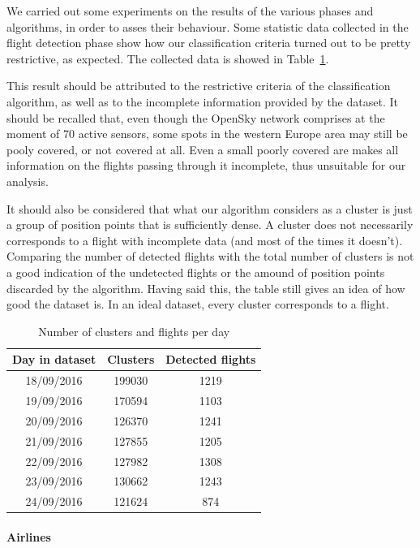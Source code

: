 \documentclass{vldb}
\begin{document}
We carried out some experiments on the results of the various phases and
algorithms, in order to asses their behaviour. Some statistic data collected in
the flight detection phase show how our classification criteria turned out to be
pretty restrictive, as expected. The collected data is showed in Table~\ref{table}.

This result should be attributed to the restrictive criteria of the
classification algorithm, as well as to the incomplete information provided by
the dataset. It should be recalled that, even though the OpenSky network
comprises at the moment of 70 active sensors, some spots in the western Europe
area may still be pooly covered, or not covered at all. Even a small poorly
covered are makes all information on the flights passing through it incomplete,
thus unsuitable for our analysis.

It should also be considered that what our algorithm considers as a cluster is
just a group of position points that is sufficiently dense. A cluster does not
necessarily corresponds to a flight with incomplete data (and most of the times
it doesn't). Comparing the number of detected flights with the total number of
clusters is not a good indication of the undetected flights or the amound of
position points discarded by the algorithm.
Having said this, the table still gives an idea of how good the dataset is. In
an ideal dataset, every cluster corresponds to a flight.

\begin{table}
  \centering
  \begin{tabular}{|c|c|c|}
  \hline
  \textbf{Day in dataset} & \textbf{Clusters} & \textbf{Detected flights} \\
  \hline
  18/09/2016 & 199030 & 1219 \\
  \hline
  19/09/2016 & 170594 & 1103 \\
  \hline
  20/09/2016 & 126370 & 1241 \\
  \hline
  21/09/2016 & 127855 & 1205 \\
  \hline
  22/09/2016 & 127982 & 1308 \\
  \hline
  23/09/2016 & 130662 & 1243 \\
  \hline
  24/09/2016 & 121624 & 874 \\
  \hline
  \end{tabular}
  \caption{Number of clusters and flights per day}
  \label{table}
\end{table}

\paragraph{Airlines}
\end{document}

